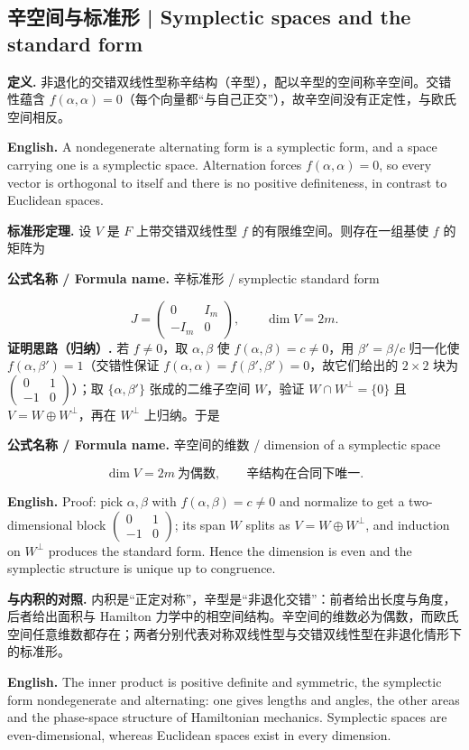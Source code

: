 \documentclass[UTF8,11pt,a4paper]{ctexart}
\newcommand{\EN}[1]{\par\noindent\textbf{English.} #1\par}
\newcommand{\FORMULA}[2]{\par\noindent\textbf{公式名称 / Formula name.} #1 / #2\par}
\begin{document}
\subsection{辛空间与标准形 | Symplectic spaces and the standard form}
\noindent\textbf{定义.} 非退化的交错双线性型称辛结构（辛型），配以辛型的空间称辛空间。交错性蕴含 $f(\alpha,\alpha)=0$（每个向量都“与自己正交”），故辛空间没有正定性，与欧氏空间相反。
\EN{A nondegenerate alternating form is a symplectic form, and a space carrying one is a symplectic space. Alternation forces $f(\alpha,\alpha)=0$, so every vector is orthogonal to itself and there is no positive definiteness, in contrast to Euclidean spaces.}
\noindent\textbf{标准形定理.} 设 $V$ 是 $F$ 上带交错双线性型 $f$ 的有限维空间。则存在一组基使 $f$ 的矩阵为
\FORMULA{辛标准形}{symplectic standard form}
\[
J=\begin{pmatrix}0&I_m\\-I_m&0\end{pmatrix},\qquad \dim V=2m.
\]
\noindent\textbf{证明思路（归纳）.} 若 $f\ne0$，取 $\alpha,\beta$ 使 $f(\alpha,\beta)=c\ne0$，用 $\beta'=\beta/c$ 归一化使 $f(\alpha,\beta')=1$（交错性保证 $f(\alpha,\alpha)=f(\beta',\beta')=0$，故它们给出的 $2\times2$ 块为 $\begin{pmatrix}0&1\\-1&0\end{pmatrix}$）；取 $\{\alpha,\beta'\}$ 张成的二维子空间 $W$，验证 $W\cap W^\perp=\{0\}$ 且 $V=W\oplus W^\perp$，再在 $W^\perp$ 上归纳。于是
\FORMULA{辛空间的维数}{dimension of a symplectic space}
\[
\dim V=2m\ \text{为偶数},\qquad \text{辛结构在合同下唯一}.
\]
\EN{Proof: pick $\alpha,\beta$ with $f(\alpha,\beta)=c\ne0$ and normalize to get a two-dimensional block $\begin{pmatrix}0&1\\-1&0\end{pmatrix}$; its span $W$ splits as $V=W\oplus W^\perp$, and induction on $W^\perp$ produces the standard form. Hence the dimension is even and the symplectic structure is unique up to congruence.}
\noindent\textbf{与内积的对照.} 内积是“正定对称”，辛型是“非退化交错”：前者给出长度与角度，后者给出面积与 Hamilton 力学中的相空间结构。辛空间的维数必为偶数，而欧氏空间任意维数都存在；两者分别代表对称双线性型与交错双线性型在非退化情形下的标准形。
\EN{The inner product is positive definite and symmetric, the symplectic form nondegenerate and alternating: one gives lengths and angles, the other areas and the phase-space structure of Hamiltonian mechanics. Symplectic spaces are even-dimensional, whereas Euclidean spaces exist in every dimension.}
\end{document}

